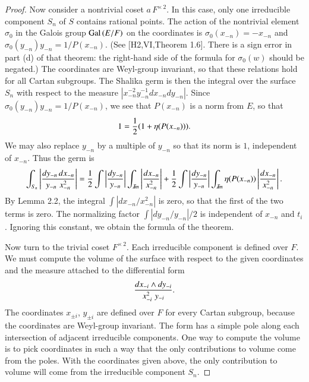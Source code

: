 \documentclass{amsart}
\newcommand\Gal{\hbox{Gal\,}}
\newcommand\Imm{{\mathcal I\hskip-.2em m}}
\begin{document}
\begin{proof}
Now consider a nontrivial coset $a\,F^{\times\,2}$.
In this case,
only one
irreducible component $S_n$ of $S$ contains rational points.
The action of the nontrivial element $\sigma_0$ in
the Galois group $\Gal(E/F)$ on the coordinates
is $\sigma_0(x_{-n}) = -x_{-n}$ and 
$\sigma_0(y_{-n}) y_{-n} = 1/P(x_{-n})$. 
(See [H2,VI,Theorem 1.6].
There is a sign error in part (d) of that theorem:
the right-hand side of the formula for $\sigma_0(w)$
should be negated.)
The coordinates are Weyl-group invariant, so that these
relations hold for all Cartan subgroups.
The Shalika germ is then the integral over the surface $S_n$
with respect to the measure $|x_{-n}^{-2} y_{-n}^{-1} dx_{-n} dy_{-n}|$.
Since $\sigma_0(y_{-n}) y_{-n} = 1/P(x_{-n})$, we see that $P(x_{-n})$
is a norm from $E$, so that
$$1 = {1\over 2} (1 + \eta(P(x_{-n}))).$$
We may also replace $y_{-n}$ by a multiple of $y_{-n}$ so that
its norm is $1$, independent of $x_{-n}$.
Thus the germ is
$$\int_{S_n} \left| {dy_{-n}\, dx_{-n}\over y_{-n}\,\, x_{-n}^2}\right|
= {1\over 2} \int\left | {dy_{-n}\over y_{-n}}\right|
 \int_{\Imm}\left | dx_{-n}\over x_{-n}^2 \right| +
 {1\over 2} \int\left | {dy_{-n}\over y_{-n}}\right|
 \int_\Imm \eta(P(x_{-n}))\left | dx_{-n}\over x_{-n}^2 \right|.$$
By Lemma 2.2, the integral $\int |dx_{-n}/x_{-n}^2|$ is zero,
so that the first of the two terms is zero.  The normalizing
factor $\int |dy_{-n}/y_{-n}|/2$ is independent
of $x_{-n}$ and $t_i$.  Ignoring this constant,
we obtain the formula of the theorem.

Now turn to the trivial coset $F^{\times\,2}$.  Each
irreducible component is defined over $F$.
We must compute the volume of the surface with respect to
the given coordinates and the measure attached to the differential form
$${d x_{-i} \wedge dy_{-i}\over x_{-i}^2 \,\,y_{-i}}.$$
The coordinates $x_{\pm i}$, $y_{\pm i}$
are defined over $F$
for every Cartan subgroup, because the 
coordinates are Weyl-group invariant.
The form has a simple pole along each intersection of adjacent
irreducible components. 
One way to compute
the volume is to pick coordinates in such a way that the
only contributions to volume come from the poles.  With
the coordinates given above, the only contribution to
volume will come from the irreducible component $S_n$.


\end{proof}
\end{document}
